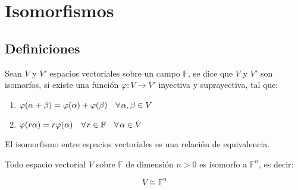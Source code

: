 
\section{Isomorfismos}

	\subsection{Definiciones}

		\begin{definicion}
			Sean $V$ y $V'$ espacios vectoriales sobre un campo $\mathbb{F}$, se dice que $V$ y $V'$ son isomorfos, si existe una función $\varphi \colon V \to V'$ inyectiva y suprayectiva, tal que:

			\begin{enumerate}
				\item $\varphi(\alpha + \beta) = \varphi(\alpha) + \varphi(\beta) \quad \forall \mkern2mu \alpha, \beta \in V$
				\item $\varphi(r \alpha) = r \varphi(\alpha) \quad \forall \mkern2mu r \in \mathbb{F} \quad \forall \mkern2mu \alpha \in V$
			\end{enumerate}
		\end{definicion}

		\begin{proposicion}
			El isomorfismo entre espacios vectoriales es una relación de equivalencia.
		\end{proposicion}

		\begin{teorema}
			Todo espacio vectorial $V$ sobre $\mathbb{F}$ de dimensión $n > 0 $ es isomorfo a $\mathbb{F}^n$, es decir:

			\begin{equation}
				V \cong \mathbb{F}^n
			\end{equation}
		\end{teorema}

